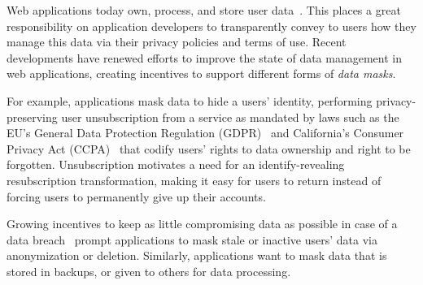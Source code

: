 

\iffalse
Web applications today own, process, and store user data~\cite{nytimes:fb, npr:data}. This places a
great responsibility on application developers to transparently convey to users how they manage this
data via their privacy policies and terms of use.
%
Recent developments have renewed efforts to improve the state of data management in web
applications, creating incentives to support different forms of \emph{data masks}.

For example, applications mask data to hide a users' identity, performing privacy-preserving user
unsubscription from a service as mandated by laws such as the EU's General Data Protection
Regulation (GDPR)~\cite{eu:gdpr} and California's Consumer Privacy Act (CCPA)~\cite{ca:privacy-act}
that codify users' rights to data ownership and right to be forgotten. Unsubscription motivates a
need for an identify-revealing resubscription transformation, making it easy for users to return
instead of forcing users to permanently give up their accounts.

Growing incentives to keep as little compromising data as possible in case of a data
breach~\cite{breach:amazon,breach:twitter, breach:fb, breach:marriott, breach:quora} prompt
applications to mask stale or inactive users' data via anonymization or deletion. Similarly,
applications want to mask data that is stored in backups, or given to others for data processing.


